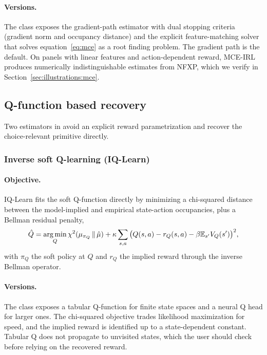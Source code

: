 \paragraph{Versions.} The  class exposes the gradient-path estimator with dual stopping criteria (gradient norm and occupancy distance) and the explicit feature-matching solver that solves equation~\eqref{eq:mce} as a root finding problem. The gradient path is the default. On panels with linear features and action-dependent reward, MCE-IRL produces numerically indistinguishable estimates from NFXP, which we verify in Section~\ref{sec:illustrations:mce}.

\subsection{Q-function based recovery}

Two estimators in  avoid an explicit reward parametrization and recover the choice-relevant primitive directly.

\subsubsection{Inverse soft Q-learning (IQ-Learn)}

\paragraph{Objective.} IQ-Learn \citep{garg2021} fits the soft Q-function directly by minimizing a chi-squared distance between the model-implied and empirical state-action occupancies, plus a Bellman residual penalty,
\begin{equation}
\hat Q = \operatorname*{arg\,min}_{Q} \chi^2(\mu_{\pi_Q} \,\|\, \hat\mu) + \kappa \sum_{s, a} \big( Q(s, a) - r_Q(s, a) - \beta \mathbb{E}_{s'} V_Q(s') \big)^2,
\label{eq:iql}
\end{equation}
with $\pi_Q$ the soft policy at $Q$ and $r_Q$ the implied reward through the inverse Bellman operator.

\paragraph{Versions.} The  class exposes a tabular Q-function for finite state spaces and a neural Q head for larger ones. The chi-squared objective trades likelihood maximization for speed, and the implied reward is identified up to a state-dependent constant. Tabular Q does not propagate to unvisited states, which the user should check before relying on the recovered reward.

